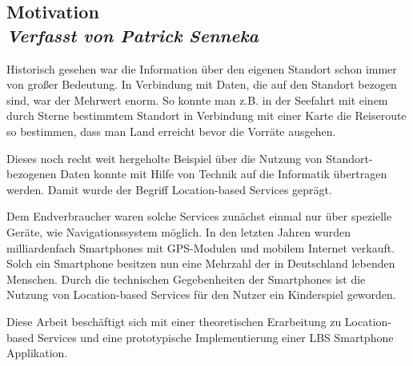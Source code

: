 \subsection[Motivation]{Motivation
 \\ \textnormal{\small{\textit {Verfasst von Patrick Senneka}}}}

Historisch gesehen war die Information über den eigenen Standort schon immer von großer Bedeutung. In Verbindung mit Daten, die auf den Standort bezogen sind, war der Mehrwert enorm. So konnte man z.B. in der Seefahrt mit einem durch Sterne bestimmtem Standort in Verbindung mit einer Karte die Reiseroute so bestimmen, dass man Land erreicht bevor die Vorräte ausgehen.

Dieses noch recht weit hergeholte Beispiel über die Nutzung von Standort-bezogenen Daten konnte mit Hilfe von Technik auf die Informatik übertragen werden. Damit wurde der Begriff Location-based Services geprägt. 

Dem Endverbraucher waren solche Services zunächst einmal nur über spezielle Geräte, wie Navigationssystem möglich. In den letzten Jahren wurden milliardenfach Smartphones mit GPS-Modulen und mobilem Internet verkauft. Solch ein Smartphone besitzen nun eine Mehrzahl der in Deutschland lebenden Menschen. \cite{bitkom} Durch die technischen Gegebenheiten der Smartphones ist die Nutzung von Location-based Services für den Nutzer ein Kinderspiel geworden. 

Diese Arbeit beschäftigt sich mit einer theoretischen Erarbeitung zu Location-based Services und eine prototypische Implementierung einer LBS Smartphone Applikation.

\newpage